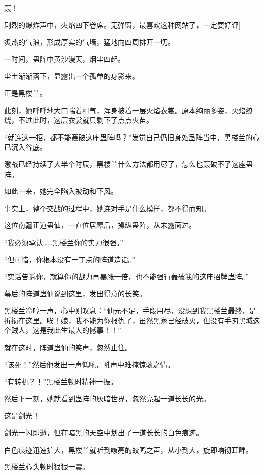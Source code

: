 
\begin{this_body}

轰！

剧烈的爆炸声中，火焰四下卷席。无弹窗，最喜欢这种网站了，一定要好评]

炙热的气浪，形成厚实的气墙，猛地向四周排开一切。

一时间，蛊阵中黄沙漫天，烟尘四起。

尘土渐渐落下，显露出一个孤单的身影来。

正是黑楼兰。

此刻，她呼呼地大口喘着粗气，浑身披着一层火焰衣裳。原本绚丽多姿，火焰缭绕，不过此时，这层衣裳就只剩下了点点火苗。

“就连这一招，都不能轰破这座蛊阵吗？”发觉自己仍旧身处蛊阵当中，黑楼兰的心已沉入谷底。

激战已经持续了大半个时辰，黑楼兰什么方法都用尽了，怎么也轰破不了这座蛊阵。

如此一来，她完全陷入被动和下风。

事实上，整个交战的过程中，她连对手是什么模样，都不得而知。

这位南疆正道蛊仙，一直位居幕后，操纵蛊阵，从未露面过。

“我必须承认……黑楼兰你的实力很强。”

“但可惜，你根本没有一丁点的阵道造诣。”

“实话告诉你，就算你的战力再暴涨一倍，也不能强行轰破我的这座招牌蛊阵。”

幕后的阵道蛊仙说到这里，发出得意的长笑。

黑楼兰冷哼一声，心中则叹息：“仙元不足，手段用尽，没想到我黑楼兰最终，是折损在这里。唉！娘，我不能为你报仇了，虽然黑家已经破灭，但没有手刃黑城这个贼人，这是我此生最大的憾事！！”

就在这时，阵道蛊仙的笑声，忽然止住。

“该死！”然后他发出一声低吼，吼声中难掩惊骇之情。

“有转机？！”黑楼兰顿时精神一振。

然后下一刻，她就看到蛊阵的灰暗世界，忽然亮起一道长长的光。

这是剑光！

剑光一闪即逝，但在暗黑的天空中划出了一道长长的白色痕迹。

白色痕迹迅速扩大，黑楼兰就听到嘹亮的蛟鸣之声，从小到大，旋即响彻耳畔。

黑楼兰心头顿时狠狠一震。


\end{this_body}

